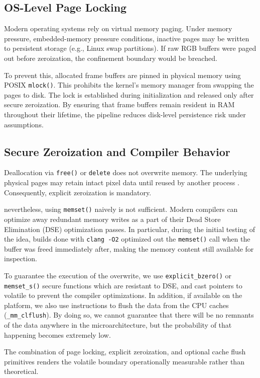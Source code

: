 \documentclass[conference]{IEEEtran}
\begin{document}
\subsection{OS-Level Page Locking}
Modern operating systems rely on virtual memory paging. Under memory pressure, embedded-memory pressure conditions, inactive pages may be written to persistent storage (e.g., Linux swap partitions). If raw RGB buffers were paged out before zeroization, the confinement boundary would be breached.

To prevent this, allocated frame buffers are pinned in physical memory using POSIX \texttt{mlock()}. This prohibits the kernel’s memory manager from swapping the pages to disk. The lock is established during initialization and released only after secure zeroization. By ensuring that frame buffers remain resident in RAM throughout their lifetime, the pipeline reduces disk-level persistence risk under assumptions.

\subsection{Secure Zeroization and Compiler Behavior}
Deallocation via \texttt{free()} or \texttt{delete} does not overwrite memory. The underlying physical pages may retain intact pixel data until reused by another process \cite{b22}. Consequently, explicit zeroization is mandatory.

nevertheless, using \texttt{memset()} naively is not sufficient. Modern compilers can optimize away redundant memory writes as a part of their Dead Store Elimination (DSE) optimization passes. In particular, during the initial testing of the idea, builds done with \texttt{clang -O2} optimized out the \texttt{memset()} call when the buffer was freed immediately after, making the memory content still available for inspection.

To guarantee the execution of the overwrite, we use \texttt{explicit\_bzero()} or \texttt{memset\_s()} secure functions which are resistant to DSE, and cast pointers to volatile to prevent the compiler optimizations. In addition, if available on the platform, we also use instructions to flush the data from the CPU caches (\texttt{\_mm\_clflush}). By doing so, we cannot guarantee that there will be no remnants of the data anywhere in the microarchitecture, but the probability of that happening becomes extremely low. 

The combination of page locking, explicit zeroization, and optional cache flush primitives renders the volatile boundary operationally measurable rather than theoretical.
\end{document}
